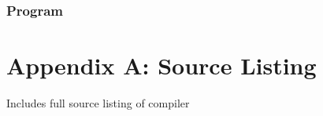 \documentclass{l3proj}
\begin{document}
\subsection{Program}
\label{cont-prog}

\appendix
\chapter{Appendix A: Source Listing}
\label{appa}

Includes full source listing of compiler



\end{document}
